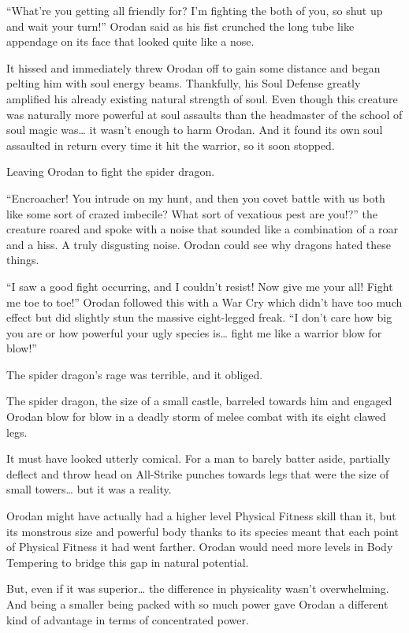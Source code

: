 \documentclass[a4paper,10pt]{book}
\begin{document}
“What’re you getting all friendly for? I’m fighting the both of you, so shut up and wait your turn!” Orodan said as his fist crunched the long tube like appendage on its face that looked quite like a nose.\par
It hissed and immediately threw Orodan off to gain some distance and began pelting him with soul energy beams. Thankfully, his Soul Defense greatly amplified his already existing natural strength of soul. Even though this creature was naturally more powerful at soul assaults than the headmaster of the school of soul magic was… it wasn’t enough to harm Orodan. And it found its own soul assaulted in return every time it hit the warrior, so it soon stopped.\par
Leaving Orodan to fight the spider dragon.\par
“Encroacher! You intrude on my hunt, and then you covet battle with us both like some sort of crazed imbecile? What sort of vexatious pest are you!?” the creature roared and spoke with a noise that sounded like a combination of a roar and a hiss. A truly disgusting noise. Orodan could see why dragons hated these things.\par
“I saw a good fight occurring, and I couldn’t resist! Now give me your all! Fight me toe to toe!” Orodan followed this with a War Cry which didn’t have too much effect but did slightly stun the massive eight-legged freak. “I don’t care how big you are or how powerful your ugly species is… fight me like a warrior blow for blow!”\par
The spider dragon’s rage was terrible, and it obliged.\par
The spider dragon, the size of a small castle, barreled towards him and engaged Orodan blow for blow in a deadly storm of melee combat with its eight clawed legs.\par
It must have looked utterly comical. For a man to barely batter aside, partially deflect and throw head on All-Strike punches towards legs that were the size of small towers… but it was a reality.\par
Orodan might have actually had a higher level Physical Fitness skill than it, but its monstrous size and powerful body thanks to its species meant that each point of Physical Fitness it had went farther. Orodan would need more levels in Body Tempering to bridge this gap in natural potential.\par
But, even if it was superior… the difference in physicality wasn’t overwhelming. And being a smaller being packed with so much power gave Orodan a different kind of advantage in terms of concentrated power.\par
\end{document}
